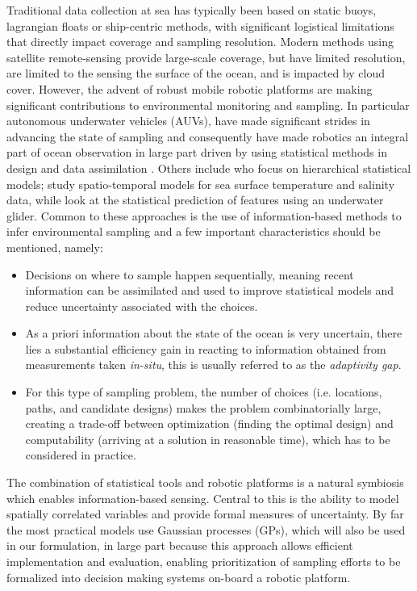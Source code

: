 \documentclass[aoas]{imsart}
\begin{document}
Traditional data collection at sea has typically been based on static buoys, lagrangian floats or ship-centric methods, with significant logistical limitations that directly impact coverage and sampling resolution. Modern methods using satellite remote-sensing provide large-scale coverage, but have limited resolution, are limited to the sensing the surface of the ocean, and is impacted by cloud cover. However, the advent of robust mobile robotic platforms \cite{Bellingham07} are making significant contributions to environmental monitoring and sampling. In particular autonomous underwater vehicles (AUVs), have made significant strides in advancing the state of sampling and consequently have made robotics an integral part of ocean observation in large part driven by using statistical methods in design and data assimilation \citep{das11b,Graham2013,Das2015,das15,fossuminformation,fossum18b}. Others include \cite{wikle2013modern} who focus on hierarchical statistical models; \cite{sahu2008space} study spatio-temporal models for sea surface temperature and salinity data, while \cite{mellucci2018oceanic} look at the statistical prediction of features using an underwater glider. Common to these approaches is the use of information-based methods to infer environmental sampling and a few important characteristics should be mentioned, namely:

\begin{itemize}
    \item Decisions on where to sample happen sequentially, meaning recent information can be assimilated and used to improve statistical models and reduce uncertainty associated with the  choices. 
    \item As a priori information about the state of the ocean is very uncertain, there lies a substantial efficiency gain in reacting to information obtained from measurements taken \emph{in-situ}, this is usually referred to as the \emph{adaptivity gap}.
    \item For this type of sampling problem, the number of choices (i.e. locations, paths, and candidate designs) makes the problem combinatorially large, creating a trade-off between optimization (finding the optimal design) and computability (arriving at a solution in reasonable time), which has to be considered in practice.
\end{itemize}{}

The combination of statistical tools and robotic platforms is a natural symbiosis which enables information-based sensing. Central to this is the ability to model spatially correlated variables and provide formal measures of uncertainty. By far the most practical models use Gaussian processes (GPs), which will also be used in our formulation, in large  part because this approach allows efficient implementation and evaluation, enabling prioritization of sampling efforts to be formalized into decision making systems on-board a robotic platform.
\end{document}
